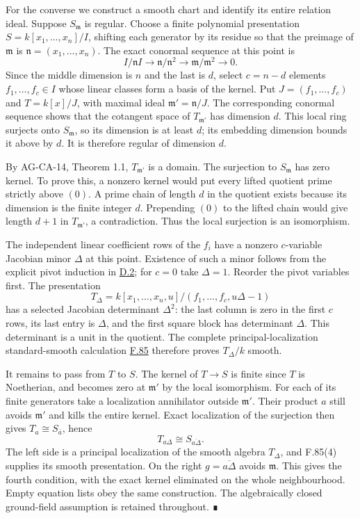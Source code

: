 \documentclass[11pt,a4paper,openany]{report}
\begin{document}
For the converse we construct a smooth chart and identify its entire relation ideal. Suppose \(S_{\mathfrak m}\) is regular. Choose a finite polynomial presentation \(S=k[x_1,\ldots,x_n]/I\), shifting each generator by its residue so that the preimage of \(\mathfrak m\) is \(\mathfrak n=(x_1,\ldots,x_n)\). The exact conormal sequence at this point is \[I/\mathfrak nI\longrightarrow\mathfrak n/\mathfrak n^2
\longrightarrow\mathfrak m/\mathfrak m^2\longrightarrow0.\] Since the middle dimension is \(n\) and the last is \(d\), select \(c=n-d\) elements \(f_1,\ldots,f_c\in I\) whose linear classes form a basis of the kernel. Put \(J=(f_1,\ldots,f_c)\) and \(T=k[x]/J\), with maximal ideal \(\mathfrak m'=\mathfrak n/J\). The corresponding conormal sequence shows that the cotangent space of \(T_{\mathfrak m'}\) has dimension \(d\). This local ring surjects onto \(S_{\mathfrak m}\), so its dimension is at least \(d\); its embedding dimension bounds it above by \(d\). It is therefore regular of dimension \(d\).

By AG-CA-14, Theorem 1.1, \(T_{\mathfrak m'}\) is a domain. The surjection to \(S_{\mathfrak m}\) has zero kernel. To prove this, a nonzero kernel would put every lifted quotient prime strictly above \((0)\). A prime chain of length \(d\) in the quotient exists because its dimension is the finite integer \(d\). Prepending \((0)\) to the lifted chain would give length \(d+1\) in \(T_{\mathfrak m'}\), a contradiction. Thus the local surjection is an isomorphism.

The independent linear coefficient rows of the \(f_i\) have a nonzero \(c\)-variable Jacobian minor \(\Delta\) at this point. Existence of such a minor follows from the explicit pivot induction in \hyperref[AG-RG-S05-smoothing-lemma-find-strictly-standard]{D.2}; for \(c=0\) take \(\Delta=1\). Reorder the pivot variables first. The presentation \[T_\Delta=k[x_1,\ldots,x_n,u]/(f_1,\ldots,f_c,u\Delta-1)\] has a selected Jacobian determinant \(\Delta^2\): the last column is zero in the first \(c\) rows, its last entry is \(\Delta\), and the first square block has determinant \(\Delta\). This determinant is a unit in the quotient. The complete principal-localization standard-smooth calculation \hyperref[AG-RG-S05-algebra-lemma-standard-smooth]{F.85} therefore proves \(T_\Delta/k\) smooth.

It remains to pass from \(T\) to \(S\). The kernel of \(T\to S\) is finite since \(T\) is Noetherian, and becomes zero at \(\mathfrak m'\) by the local isomorphism. For each of its finite generators take a localization annihilator outside \(\mathfrak m'\). Their product \(a\) still avoids \(\mathfrak m'\) and kills the entire kernel. Exact localization of the surjection then gives \(T_a\cong S_{\bar a}\), hence \[T_{a\Delta}\cong S_{\overline{a\Delta}}.\] The left side is a principal localization of the smooth algebra \(T_\Delta\), and F.85(4) supplies its smooth presentation. On the right \(g=\overline{a\Delta}\) avoids \(\mathfrak m\). This gives the fourth condition, with the exact kernel eliminated on the whole neighbourhood. Empty equation lists obey the same construction. The algebraically closed ground-field assumption is retained throughout. ∎
\end{document}
